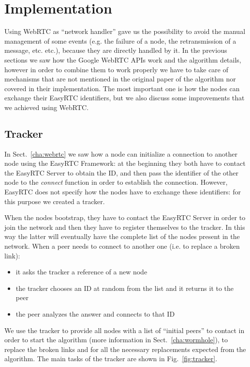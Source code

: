 
\chapter{Implementation}
\label{cha:implementation}
Using WebRTC as ``network handler'' gave us the possibility to avoid the manual management of some events (e.g. the failure of a node, the retransmission of a message, etc. etc.), because they are directly handled by it. In the previous sections we saw how the Google WebRTC APIs work and the algorithm details, however in order to combine them to work properly we have to take care of mechanisms that are not mentioned in the original paper of the algorithm nor covered in their implementation. The most important one is how the nodes can exchange their EasyRTC identifiers, but we also discuss some improvements that we achieved using WebRTC.

\section{Tracker}
\label{cha:tracker}
In Sect.~\ref{cha:webrtc} we saw how a node can initialize a connection to another node using the EasyRTC Framework: at the beginning they both have to contact the EasyRTC Server to obtain the ID, and then pass the identifier of the other node to the \textsf{\textit{connect}} function in order to establish the connection. However, EasyRTC does not specify how the nodes have to exchange these identifiers: for this purpose we created a tracker. 

When the nodes bootstrap, they have to contact the EasyRTC Server in order to join the network and then they have to register themselves to the tracker. In this way the latter will eventually have the complete list of the nodes present in the network. When a peer needs to connect to another one (i.e. to replace a broken link):
\begin{itemize}
	\item it asks the tracker a reference of a new node
	\item the tracker chooses an ID at random from the list and it returns it to the peer
	\item the peer analyzes the answer and connects to that ID
\end{itemize}

We use the tracker to provide all nodes with a list of ``initial peers'' to contact in order to start the algorithm (more information in Sect.~\ref{cha:wormhole}), to replace the broken links and for all the necessary replacements expected from the algorithm. The main tasks of the tracker are shown in Fig.~\ref{fig:tracker}.

